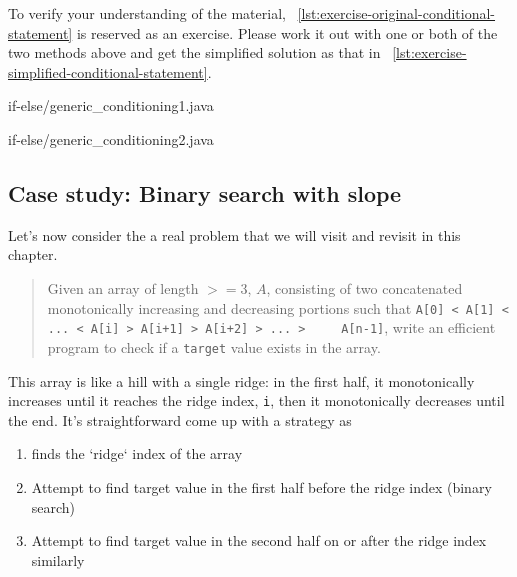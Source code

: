 \documentclass[oneside,11pt]{book}
\theoremstyle{definition}
\theoremstyle{remark}
\newcommand{\code}[1]{\mbox{\lstinline{#1}}}
\begin{document}
To verify your understanding of the material,
~\autoref{lst:exercise-original-conditional-statement} is reserved as an exercise.
Please work it out with one or both of the two methods above and get the simplified solution as
that in ~\autoref{lst:exercise-simplified-conditional-statement}.
\begin{clisting}
    \begin{minipage}[t]{.4\textwidth}
        
        {if-else/generic_conditioning1.java}
    \end{minipage}\hfill
    \begin{minipage}[t]{.4\textwidth}
        
        {if-else/generic_conditioning2.java}
    \end{minipage}
\end{clisting}

\subsection{Case study: Binary search with slope}\label{subsec:case-study:binary-search-direction}

Let's now consider the a real problem that we will visit and revisit in this chapter.
\begin{quote}
    Given an array of length $>= 3$, $A$, consisting of two concatenated monotonically increasing
    and decreasing portions such that \code{A[0] < A[1] < ... < A[i] > A[i+1] > A[i+2] > ... >
    A[n-1]}, write an efficient program to check if a \code{target} value exists in the array.
\end{quote}

This array is like a hill with a single ridge: in the first half, it monotonically increases until
it reaches the ridge index, \code{i}, then it monotonically decreases until the end.
It's straightforward come up with a strategy as
\begin{enumerate}
    \item finds the `ridge` index of the array
    \item Attempt to find target value in the first half before the ridge index (binary search)
    \item Attempt to find target value in the second half on or after the ridge index similarly
\end{enumerate}
\end{document}
